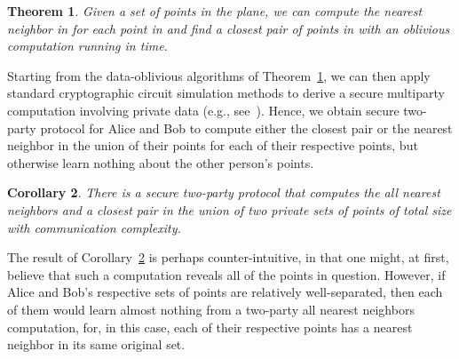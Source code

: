 \documentclass[11pt]{article}
\newtheorem{theorem}{Theorem}
\newtheorem{corollary}[theorem]{Corollary}
\begin{document}
{\begin{theorem} \label{thm:neighbors}
Given a set  of  points in the plane, we can compute the
nearest neighbor in  for each point in  and find a closest
pair of points in  with an oblivious
computation running in  time.
\end{theorem}

Starting from the data-oblivious algorithms of Theorem~\ref{thm:neighbors},
we can then apply standard cryptographic circuit simulation
methods to derive a secure multiparty computation involving private data 
(e.g., see~\cite{bnp-fssmp-08,clos-uctms-02,da-smpcp-01,dz-passm-02,m-smpcm-06,mnps-fstpc-04}).
Hence, we obtain secure two-party protocol for Alice and Bob to
compute either the closest pair or 
the nearest neighbor in the union of their  points for
each of their respective points, but otherwise learn nothing about
the other person's points. 

\begin{corollary} \label{cor:neighbors}
  There is a secure two-party protocol that computes the all nearest
  neighbors and a closest pair in the union of two private sets of
  points of total size  with  communication complexity.
\end{corollary}

The result of Corollary~\ref{cor:neighbors} is perhaps counter-intuitive,
in that one might, at
first, believe that such a computation reveals
all of the points in question. 
However, if Alice and Bob's respective sets of points are relatively
well-separated, then each of them would learn almost nothing from a
two-party all nearest neighbors computation, for, in this case, each
of their respective points has a nearest neighbor 
in its same original set.



}
\end{document}

